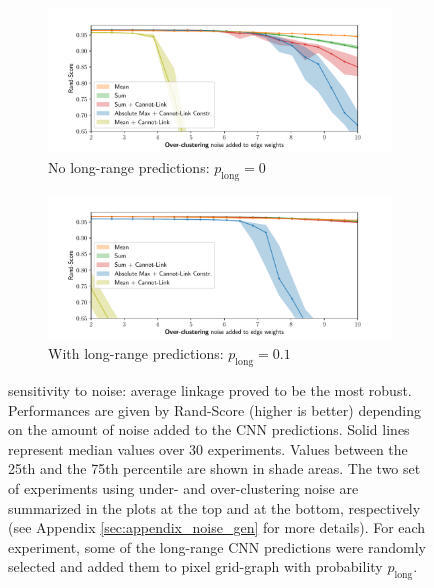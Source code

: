 \begin{figure}
        \begin{subfigure}[t]{0.49 \textwidth}
        \centering
        \includegraphics[width=\textwidth,trim=0.53in 0.1in 0.65in 0.2in,clip]{./figs/noise_plots/over_segment_plots_0.pdf}
        \caption{No long-range predictions: $p_{\mathrm{long}}=0$} \label{fig:merge_noise_only_direct}
    \end{subfigure} \hfill
    \begin{subfigure}[t]{0.49 \textwidth}
        \centering
        \includegraphics[width=\textwidth,trim=0.53in 0.1in 0.65in 0.20in,clip]{./figs/noise_plots/over_segment_plots_1.pdf}
        \caption{With long-range predictions: $p_{\mathrm{long}}=0.1$} \label{fig:merge_noise_with_long_range}
    \end{subfigure}
\caption{\algname{} sensitivity to noise:  average linkage proved to be the most robust. Performances are given by Rand-Score (higher is better) depending on the amount of noise added to the CNN predictions.  Solid lines represent median values over 30 experiments. Values between the 25th and the 75th percentile are shown in shade areas. The two set of experiments using under- and over-clustering noise are summarized in the plots at the top and at the bottom, respectively (see Appendix \ref{sec:appendix_noise_gen} for more details). For each experiment, some of the long-range CNN predictions were randomly selected and added them to pixel grid-graph with probability $p_{\mathrm{long}}$.
}\label{fig:noise_plots}
\end{figure}
